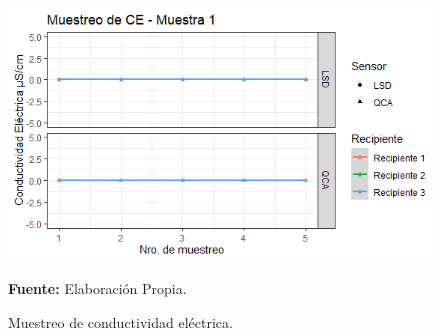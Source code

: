     \begin{figure}[H]
        \centering
        \includegraphics[width=0.75\linewidth]{Imagenes/cap4/CE_M1.png}
        \caption {Muestreo de conductividad el\'ectrica. }{\textbf{Fuente:}
        Elaboraci\'on Propia. }
        \label{fig:M1CE}
    \end{figure}


